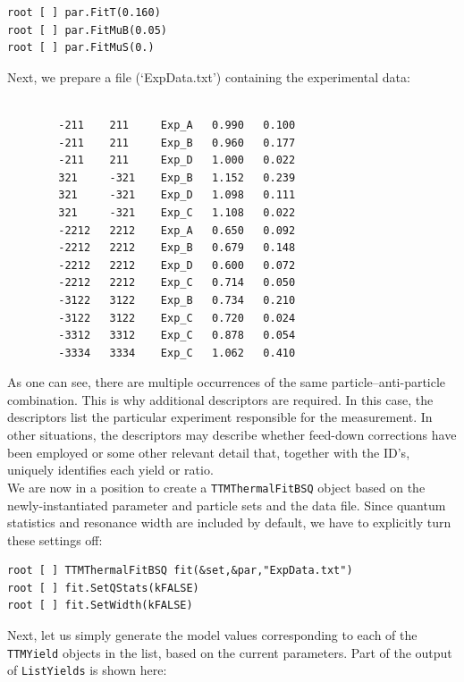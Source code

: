 \documentclass{elsarticle}
\begin{document}
\small
\begin{verbatim}
root [ ] par.FitT(0.160)
root [ ] par.FitMuB(0.05)
root [ ] par.FitMuS(0.)
\end{verbatim}
\normalsize

\noindent
Next, we prepare a file (`ExpData.txt') containing the experimental data:

\small
\begin{verbatim}

        -211    211     Exp_A   0.990   0.100
        -211    211     Exp_B   0.960   0.177
        -211    211     Exp_D   1.000   0.022
        321     -321    Exp_B   1.152   0.239
        321     -321    Exp_D   1.098   0.111
        321     -321    Exp_C   1.108   0.022
        -2212   2212    Exp_A   0.650   0.092
        -2212   2212    Exp_B   0.679   0.148
        -2212   2212    Exp_D   0.600   0.072
        -2212   2212    Exp_C   0.714   0.050
        -3122   3122    Exp_B   0.734   0.210
        -3122   3122    Exp_C   0.720   0.024
        -3312   3312    Exp_C   0.878   0.054
        -3334   3334    Exp_C   1.062   0.410
\end{verbatim}
\normalsize

\noindent
As one can see, there are multiple occurrences of the same particle--anti-particle combination. This is why 
additional descriptors are required. In this case, the descriptors list the particular experiment 
responsible for the measurement. In other situations, the descriptors may describe whether feed-down corrections 
have been employed or some other relevant detail that, together with the ID's, uniquely identifies each yield or ratio.\\   

We are now in a position to create a \texttt{TTMThermalFitBSQ} object based on the newly-instantiated 
parameter 
and particle sets and the data file. Since quantum statistics and resonance width are included by default, 
we have to explicitly turn these settings off: 

\small
\begin{verbatim}
root [ ] TTMThermalFitBSQ fit(&set,&par,"ExpData.txt")
root [ ] fit.SetQStats(kFALSE)
root [ ] fit.SetWidth(kFALSE)
\end{verbatim}
\normalsize

\noindent
Next, let us simply generate the model values corresponding to each of the \texttt{TTMYield} objects in the list, based on the current parameters. Part of the output of \texttt{ListYields} is shown here: 
\end{document}
